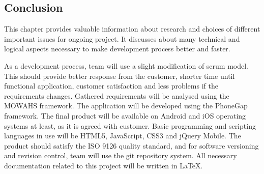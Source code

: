 \subsection{Conclusion}

This chapter provides valuable information about research and choices of different important issues for ongoing project. It discusses about many technical and logical aspects necessary to make development process better and faster.\newline

As a development process, team will use a slight modification of scrum model. This should provide better response from the customer, shorter time until functional application, customer satisfaction and less problems if the requirements changes. Gathered requirements will be analysed using the MOWAHS framework. The application will be developed using the PhoneGap framework. The final product will be available on Android and iOS operating systems at least, as it is agreed with customer. Basic programming and scripting languages in use will be HTML5, JavaScript, CSS3 and jQuery Mobile. The product should satisfy the ISO 9126 quality standard, and for software versioning and revision control, team will use the git repository system. All necessary documentation related to this project will be written in LaTeX.
